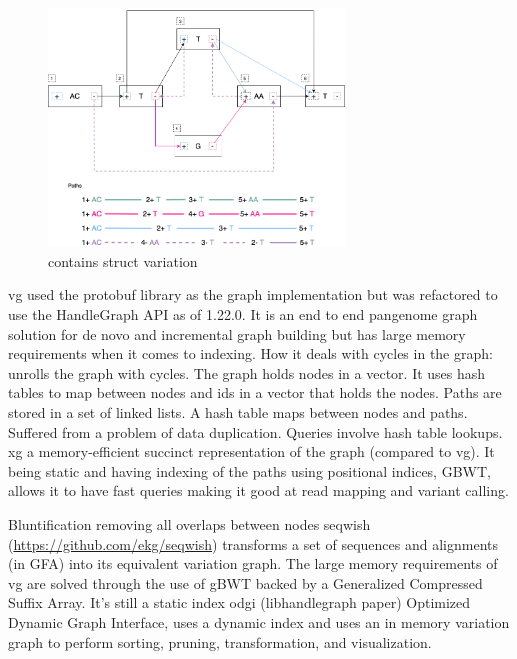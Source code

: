 \documentclass[11pt]{article}
\begin{document}
\begin{figure}[H]
\centering
\includegraphics[width=0.7\textwidth]{assets/images/Variation Graph-Page-2.png} 
\caption{contains struct variation}\label{contains struct}
\end{figure}

vg \cite{garrisonVariationGraphToolkit2018} used the protobuf library as the 
graph implementation but was refactored to use the HandleGraph API as of 1.22.0.
It is an end to end pangenome graph solution for de novo and incremental graph
building but has large memory requirements when it comes to indexing. 
How it deals with cycles in the graph: unrolls the graph with cycles. 
The graph holds nodes in a vector. It uses hash tables to map between nodes and 
ids in a vector that holds the nodes. Paths are stored in a set of linked lists. 
A hash table maps between nodes and paths. Suffered from a problem of data
duplication.
Queries involve hash table lookups.
xg \cite{garrisonGraphicalPangenomics2019} a memory-efficient succinct 
representation of the graph (compared to vg). 
It being static and having indexing of the paths using positional indices, GBWT,
allows it to have fast queries making it good at  read mapping and variant 
calling.

Bluntification \cite{gargGraphbasedApproachDiploid2018} removing all overlaps 
between nodes seqwish (\url{https://github.com/ekg/seqwish}) transforms a set of 
sequences and alignments (in GFA) into its equivalent variation graph.
The large memory requirements of vg are solved through the use of gBWT backed
by a Generalized Compressed Suffix Array. It’s still a static index odgi
(libhandlegraph paper) Optimized Dynamic Graph Interface, uses a dynamic index
and uses an in memory variation graph to perform sorting, pruning, 
transformation, and visualization.
\end{document}
